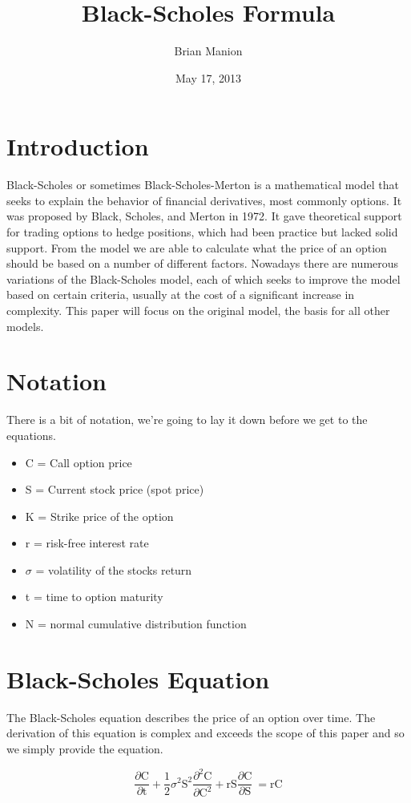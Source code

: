 \documentclass{article}
\title{Black-Scholes Formula}
\author{Brian Manion}
\date{May 17, 2013}
\begin{document}
\maketitle
\section{Introduction}
    Black-Scholes or sometimes Black-Scholes-Merton is a mathematical model that seeks to explain the behavior of financial derivatives, most commonly options. 
    It was proposed by Black, Scholes, and Merton in 1972. It gave theoretical support for trading options to hedge positions, 
	which had been practice but lacked solid support. From the model we are able to calculate what the price of an option should be based on a number of 
	different factors. Nowadays there are numerous variations of the Black-Scholes model, each of which seeks to improve the model based on certain criteria, 
	usually at the cost of a significant increase in complexity. This paper will focus on the original model, the basis for all other models.
\section{Notation}
There is a bit of notation, we're going to lay it down before we get to the equations.
\begin{itemize}
\item[] C = Call option price
\item[] S = Current stock price (spot price)
\item[] K = Strike price of the option
\item[] r = risk-free interest rate
\item[] $\sigma$ = volatility of the stocks return
\item[] t = time to option maturity
\item[] N = normal cumulative distribution function
\end{itemize}

\section{Black-Scholes Equation}
The Black-Scholes equation describes the price of an option over time. The derivation of this equation is complex and exceeds the scope of this paper 
and so we simply provide the equation.


\begin{equation}
\frac{\partial \mathrm C}{ \partial \mathrm t } + \frac{1}{2}\sigma^{2} \mathrm S^{2} \frac{\partial^{2} \mathrm C}{\partial \mathrm C^2}
+ \mathrm r \mathrm S \frac{\partial \mathrm C}{\partial \mathrm S}\ =
\mathrm r \mathrm C 
\label{eq:1}
\end{equation}
\end{document}
